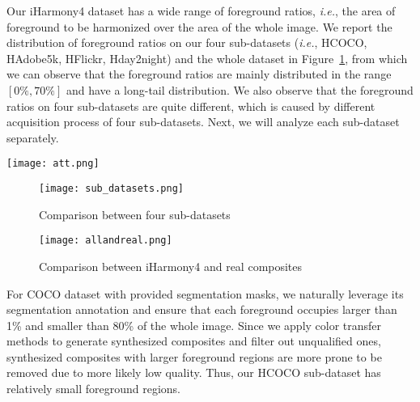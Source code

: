 \documentclass[10pt,twocolumn,letterpaper]{article}
\begin{document}
Our iHarmony4 dataset has a wide range of foreground ratios, \emph{i.e.}, the area of foreground to be harmonized over the area of the whole image. We report the distribution of foreground ratios on our four sub-datasets (\emph{i.e.}, HCOCO, HAdobe5k, HFlickr, Hday2night) and the whole dataset in Figure~\ref{Fig:R1}, from which we can observe that the foreground ratios are mainly distributed in the range $[0\%, 70\%]$ and have a long-tail distribution. We also observe that the foreground ratios on four sub-datasets are quite different, which is caused by different acquisition process of four sub-datasets. Next, we will analyze each sub-dataset separately.

\begin{figure*}[tp!]
\begin{center}
\texttt{[image: att.png]}
\end{center}
   \caption{Illustration of our proposed attention module. (a). original U-Net structure without attention module; (b). U-Net with our attention module.}
\label{fig:att}
\end{figure*}

\begin{figure*}[hb]
	\centering
	\begin{subfigure}[t]{3in}
		\centering
		\texttt{[image: sub\_datasets.png]}
		\caption{Comparison between four sub-datasets}\label{Fig:R1}		
	\end{subfigure}
	\quad
	\begin{subfigure}[t]{3in}
		\centering
		\texttt{[image: allandreal.png]}
		\caption{Comparison between iHarmony4 and real composites}\label{Fig:R2}
	\end{subfigure}
	\caption{The distributions of foreground ratios. (a) Comparison between four sub-datasets shows that HCOCO and Hday2night have more images with small foreground regions while HAdobe5k and HFlickr have more images with large foreground regions. (b) Comparison between iHarmony4 and real composites in \cite{xue2012understandingsupp,tsai2017deepsupp} shows that the distribution of foreground ratios of iHarmony4 dataset is close to that of real composite images.}\label{fig:ratio}
\end{figure*}


For COCO dataset \cite{lin2014microsoftsupp} with provided segmentation masks, we naturally leverage its segmentation annotation and ensure that each foreground occupies larger than 1\% and smaller than 80\% of the whole image. Since we apply color transfer methods to generate synthesized composites and filter out unqualified ones, synthesized composites with larger foreground regions are more prone to be removed due to more likely low quality. Thus, our HCOCO sub-dataset has relatively small foreground regions.
\end{document}
